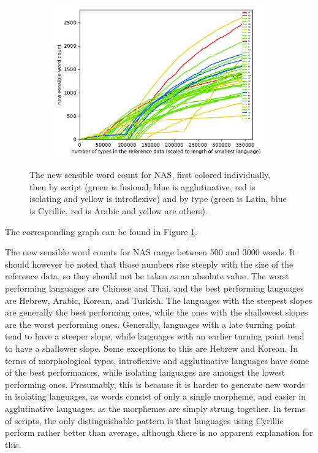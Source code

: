\documentclass[11pt,a4paper,twoside,openright]{scrbook}
\begin{document}
\begin{figure}[h]
\begin{subfigure}[b]{0.32\textwidth}
    	\centering
        \includegraphics[width=\textwidth]{graphs/nas/scripts/norm_huge_type_type_performance}
    \end{subfigure}
    \caption{The new sensible word count for NAS, first colored individually, then by script (green is fusional, blue is agglutinative, red is isolating and yellow is introflexive) and by type (green is Latin, blue is Cyrillic, red is Arabic and yellow are others).}
	\label{Figure:nas_norm_huge_type_type_performance}
\end{figure}

The corresponding graph can be found in Figure \ref{Figure:nas_norm_huge_type_type_performance}.

The new sensible word counts for NAS range between 500 and 3000 words. It should however be noted that those numbers rise steeply with the size of the reference data, so they should not be taken as an absolute value. The worst performing languages are Chinese and Thai, and the best performing languages are Hebrew, Arabic, Korean, and Turkish. The languages with the steepest slopes are generally the best performing ones, while the ones with the shallowest slopes are the worst performing ones. Generally, languages with a late turning point tend to have a steeper slope, while languages with an earlier turning point tend to have a shallower slope. Some exceptions to this are Hebrew and Korean. In terms of morphological types, introflexive and agglutinative languages have some of the best performances, while isolating languages are amongst the lowest performing ones. Presumably, this is because it is harder to generate new words in isolating languages, as words consist of only a single morpheme, and easier in agglutinative languages, as the morphemes are simply strung together. In terms of scripts, the only distinguishable pattern is that languages using Cyrillic perform rather better than average, although there is no apparent explanation for this. 
\end{document}

